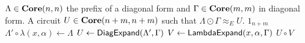 \begin{algorithm}[t]
\caption{$\DiagExpand( \Lambda, \Gamma )$}\label{Alg:DiagExpand}
\begin{algorithmic}
\Require $\Lambda \in \mathbf{Core}( n, n )$ the prefix of a diagonal form and $\Gamma \in \mathbf{Core}( m, m )$ in diagonal form.
\Ensure A circuit $U \in \mathbf{Core}( n + m, n + m )$ such that $\Lambda \odot \Gamma \approx_E U$.
        \Return $1_{n+m}$
    \EndIf
    \State $\Lambda' \circ \lambda( x, \alpha ) \gets \Lambda$
    \State $U \gets \mathsf{DiagExpand}( \Lambda', \Gamma )$
    \State $V \gets \mathsf{LambdaExpand}( x, \alpha, \Gamma )$
    \State \Return $U \circ V$
\end{algorithmic}
\end{algorithm}
